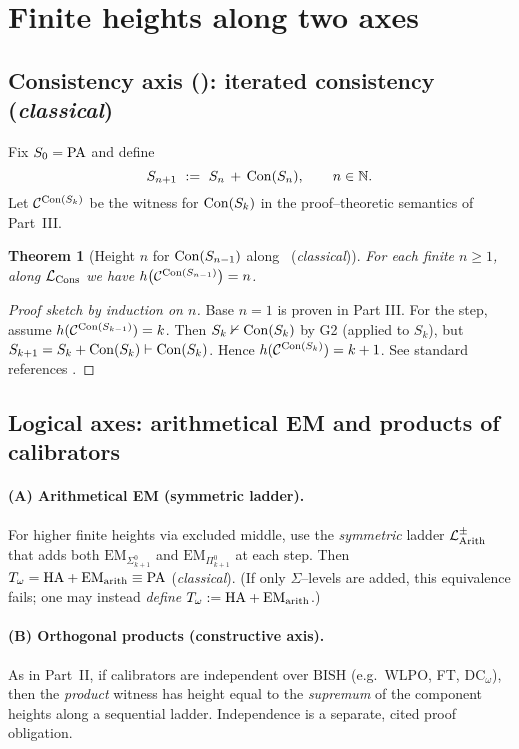 \documentclass[11pt]{article}
\newtheorem{theorem}{Theorem}[section]
\theoremstyle{definition}
\theoremstyle{remark}
\newcommand{\WLPO}{\mathrm{WLPO}}
\newcommand{\BISH}{\mathrm{BISH}}
\begin{document}
\section{Finite heights along two axes}

\subsection{Consistency axis \texorpdfstring{(\LCons)}{(LCons)}: iterated consistency (\emph{classical})}
Fix $S_0=\mathrm{PA}$ and define
\[
S_{n+1}\ :=\ S_n\,+\,\mathrm{Con}(S_n),\qquad n\in\mathbb N.
\]
Let $\mathcal C^{\mathrm{Con}(S_{k})}$ be the witness for $\mathrm{Con}(S_k)$ in the proof--theoretic semantics of Part~III.

\begin{theorem}[Height $n$ for $\mathrm{Con}(S_{n-1})$ along \LCons\ (\emph{classical})]\label{IV:thm:finite-Con}
For each finite $n\ge 1$, along $\mathcal{L}_{\mathrm{Cons}}$ we have $h\!\left(\mathcal C^{\mathrm{Con}(S_{n-1})}\right)=n$.
\end{theorem}

\begin{proof}[Proof sketch by induction on $n$]
Base $n=1$ is proven in Part III. For the step, assume
$h(\mathcal C^{\mathrm{Con}(S_{k-1})})=k$. Then $S_k\nvdash \mathrm{Con}(S_k)$ by G2 (applied to $S_k$),
but $S_{k+1}=S_k+\mathrm{Con}(S_k)\vdash\mathrm{Con}(S_k)$. Hence $h(\mathcal C^{\mathrm{Con}(S_k)})=k+1$.
See standard references \cite{HajekPudlak}.
\end{proof}

\subsection{Logical axes: arithmetical EM and products of calibrators}
\paragraph{(A) Arithmetical EM (symmetric ladder).}
For higher finite heights via excluded middle, use the \emph{symmetric} ladder
$\mathcal{L}_{\mathrm{Arith}}^{\pm}$ that adds both $\mathrm{EM}_{\Sigma^0_{k+1}}$ and $\mathrm{EM}_{\Pi^0_{k+1}}$ at each step.
Then $T_\omega=\mathrm{HA}+\mathrm{EM}_{\mathrm{arith}}\equiv \mathrm{PA}$ (\emph{classical}).
(If only $\Sigma$--levels are added, this equivalence fails; one may instead \emph{define}
$T_\omega:=\mathrm{HA}+\mathrm{EM}_{\mathrm{arith}}$.)

\paragraph{(B) Orthogonal products (constructive axis).}
As in Part~II, if calibrators are independent over \(\BISH\) (e.g.\ \(\WLPO\), FT, $\mathrm{DC}_\omega$),
then the \emph{product} witness has height equal to the \emph{supremum} of the component heights along a sequential ladder.
Independence is a separate, cited proof obligation.
\end{document}
